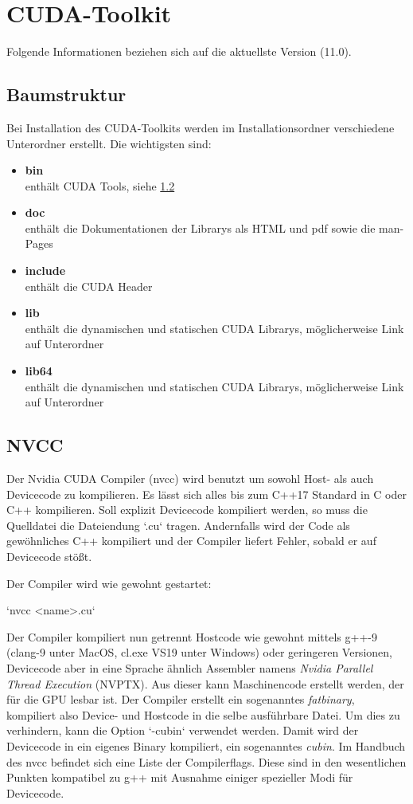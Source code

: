 		\section{CUDA-Toolkit}
		Folgende Informationen beziehen sich auf die aktuellste Version (11.0).
		
			\subsection{Baumstruktur}\label{tree}
			Bei Installation des CUDA-Toolkits werden im Installationsordner verschiedene Unterordner erstellt. Die wichtigsten sind:
			\begin{itemize}
			    \item \textbf{bin}\\ enthält CUDA Tools, siehe \ref{tools}
			    \item \textbf{doc}\\ enthält die Dokumentationen der Librarys als HTML und pdf sowie die man-Pages
			    \item \textbf{include}\\ enthält die CUDA Header
			    \item \textbf{lib}\\ enthält die dynamischen und statischen CUDA Librarys, möglicherweise Link auf Unterordner
			    \item \textbf{lib64}\\ enthält die dynamischen und statischen CUDA Librarys, möglicherweise Link auf Unterordner
			\end{itemize}
			\subsection{NVCC}\label{tools}
			Der Nvidia CUDA Compiler (\gls{nvcc}) wird benutzt um sowohl Host- als auch Devicecode zu kompilieren. Es lässt sich alles bis zum C++17 Standard in C oder C++ kompilieren. Soll explizit Devicecode kompiliert werden, so muss die Quelldatei die Dateiendung \li`.cu` tragen. Andernfalls wird der Code als gewöhnliches C++ kompiliert und der Compiler liefert Fehler, sobald er auf Devicecode stößt.
		
			Der Compiler wird wie gewohnt gestartet:
		
			\li`nvcc <name>.cu`
		
			Der Compiler kompiliert nun getrennt Hostcode wie gewohnt mittels g++-9 (clang-9 unter MacOS, cl.exe VS19 unter Windows) oder geringeren Versionen, Devicecode aber in eine Sprache ähnlich Assembler namens \textit{Nvidia Parallel Thread Execution} (\Gls{NVPTX}). Aus dieser kann Maschinencode erstellt werden, der für die GPU lesbar ist. Der Compiler erstellt ein sogenanntes \textit{fatbinary}, kompiliert also Device- und Hostcode in die selbe ausführbare Datei. Um dies zu verhindern, kann die Option \li`-cubin` verwendet werden. Damit wird der Devicecode in ein eigenes Binary kompiliert, ein sogenanntes \textit{cubin}. Im Handbuch des \gls{nvcc} \autocite{cudaNVCC} befindet sich eine Liste der Compilerflags. Diese sind in den wesentlichen Punkten kompatibel zu g++ mit Ausnahme einiger spezieller Modi für Devicecode.
		
